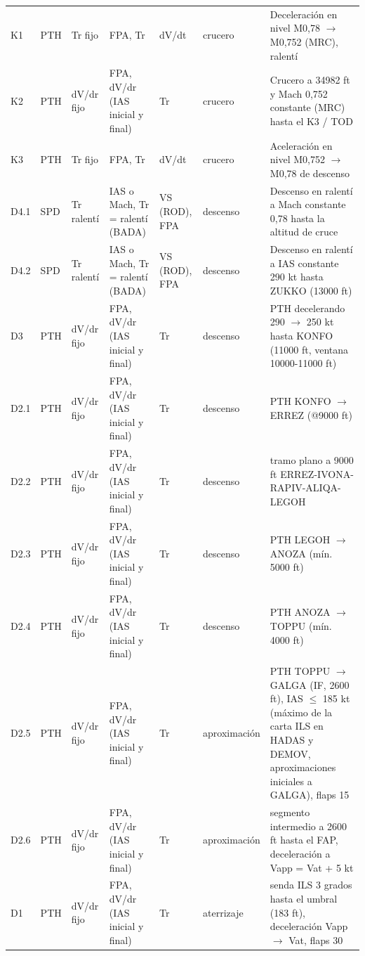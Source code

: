 \begin{longtable}{lll>{\raggedright\arraybackslash}p{2.5cm}ll>{\raggedright\arraybackslash}p{4.3cm}}
K1 & PTH & Tr fijo & FPA, Tr & dV/dt & crucero & \scriptsize Deceleración en nivel M0,78 $\rightarrow$ M0,752 (MRC), ralentí\\
K2 & PTH & dV/dr fijo & FPA, dV/dr (IAS inicial y final) & Tr & crucero & \scriptsize Crucero a 34982 ft y Mach 0,752 constante (MRC) hasta el K3 / TOD\\
K3 & PTH & Tr fijo & FPA, Tr & dV/dt & crucero & \scriptsize Aceleración en nivel M0,752 $\rightarrow$ M0,78 de descenso\\
D4.1 & SPD & Tr ralentí & IAS o Mach, Tr = ralentí (BADA) & VS (ROD), FPA & descenso & \scriptsize Descenso en ralentí a Mach constante 0,78 hasta la altitud de cruce\\
D4.2 & SPD & Tr ralentí & IAS o Mach, Tr = ralentí (BADA) & VS (ROD), FPA & descenso & \scriptsize Descenso en ralentí a IAS constante 290 kt hasta ZUKKO (13000 ft)\\
D3 & PTH & dV/dr fijo & FPA, dV/dr (IAS inicial y final) & Tr & descenso & \scriptsize PTH decelerando 290 $\rightarrow$ 250 kt hasta KONFO (11000 ft, ventana 10000-11000 ft)\\
D2.1 & PTH & dV/dr fijo & FPA, dV/dr (IAS inicial y final) & Tr & descenso & \scriptsize PTH KONFO $\rightarrow$ ERREZ (@9000 ft)\\
D2.2 & PTH & dV/dr fijo & FPA, dV/dr (IAS inicial y final) & Tr & descenso & \scriptsize tramo plano a 9000 ft ERREZ-IVONA-RAPIV-ALIQA-LEGOH\\
D2.3 & PTH & dV/dr fijo & FPA, dV/dr (IAS inicial y final) & Tr & descenso & \scriptsize PTH LEGOH $\rightarrow$ ANOZA (mín. 5000 ft)\\
D2.4 & PTH & dV/dr fijo & FPA, dV/dr (IAS inicial y final) & Tr & descenso & \scriptsize PTH ANOZA $\rightarrow$ TOPPU (mín. 4000 ft)\\
D2.5 & PTH & dV/dr fijo & FPA, dV/dr (IAS inicial y final) & Tr & aproximación & \scriptsize PTH TOPPU $\rightarrow$ GALGA (IF, 2600 ft), IAS $\le$ 185 kt (máximo de la carta ILS en HADAS y DEMOV, aproximaciones iniciales a GALGA), flaps 15\\
D2.6 & PTH & dV/dr fijo & FPA, dV/dr (IAS inicial y final) & Tr & aproximación & \scriptsize segmento intermedio a 2600 ft hasta el FAP, deceleración a Vapp = Vat + 5 kt\\
D1 & PTH & dV/dr fijo & FPA, dV/dr (IAS inicial y final) & Tr & aterrizaje & \scriptsize senda ILS 3 grados hasta el umbral (183 ft), deceleración Vapp $\rightarrow$ Vat, flaps 30\\
\end{longtable}
\endgroup
